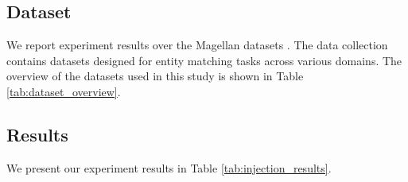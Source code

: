 \subsection{Dataset}

We report experiment results over the Magellan datasets \cite{magellandata}. The data collection contains datasets designed for entity matching tasks across various domains. The overview of the datasets used in this study is shown in Table \ref{tab:dataset_overview}.

\begin{table}[h]
\centering
{}
\caption{Dataset Summary}
\label{tab:dataset_overview}
\end{table}
\vspace{-0.5cm}






\subsection{Results}
We present our experiment results in Table \ref{tab:injection_results}.




